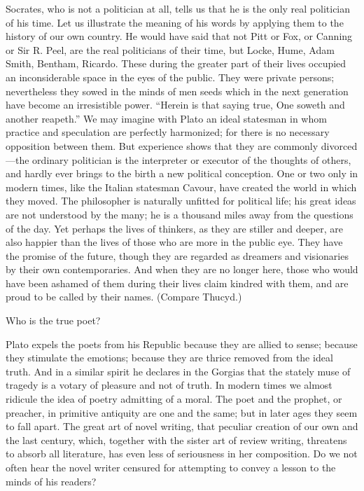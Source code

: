 \documentclass[11pt,letter]{article}
\begin{document}
\par  Socrates, who is not a politician at all, tells us that he is the only real politician of his time. Let us illustrate the meaning of his words by applying them to the history of our own country. He would have said that not Pitt or Fox, or Canning or Sir R. Peel, are the real politicians of their time, but Locke, Hume, Adam Smith, Bentham, Ricardo. These during the greater part of their lives occupied an inconsiderable space in the eyes of the public. They were private persons; nevertheless they sowed in the minds of men seeds which in the next generation have become an irresistible power. “Herein is that saying true, One soweth and another reapeth.” We may imagine with Plato an ideal statesman in whom practice and speculation are perfectly harmonized; for there is no necessary opposition between them. But experience shows that they are commonly divorced—the ordinary politician is the interpreter or executor of the thoughts of others, and hardly ever brings to the birth a new political conception. One or two only in modern times, like the Italian statesman Cavour, have created the world in which they moved. The philosopher is naturally unfitted for political life; his great ideas are not understood by the many; he is a thousand miles away from the questions of the day. Yet perhaps the lives of thinkers, as they are stiller and deeper, are also happier than the lives of those who are more in the public eye. They have the promise of the future, though they are regarded as dreamers and visionaries by their own contemporaries. And when they are no longer here, those who would have been ashamed of them during their lives claim kindred with them, and are proud to be called by their names. (Compare Thucyd.)

\par  Who is the true poet?

\par  Plato expels the poets from his Republic because they are allied to sense; because they stimulate the emotions; because they are thrice removed from the ideal truth. And in a similar spirit he declares in the Gorgias that the stately muse of tragedy is a votary of pleasure and not of truth. In modern times we almost ridicule the idea of poetry admitting of a moral. The poet and the prophet, or preacher, in primitive antiquity are one and the same; but in later ages they seem to fall apart. The great art of novel writing, that peculiar creation of our own and the last century, which, together with the sister art of review writing, threatens to absorb all literature, has even less of seriousness in her composition. Do we not often hear the novel writer censured for attempting to convey a lesson to the minds of his readers?
\end{document}
